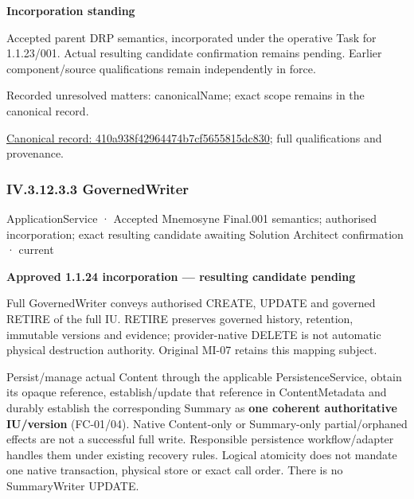 \par\medskip\textbf{Incorporation standing}\par


Accepted parent DRP semantics, incorporated under the operative Task for 1.1.23/001. Actual resulting candidate confirmation remains pending. Earlier component/source qualifications remain independently in force.


{\small Recorded unresolved matters: canonicalName; exact scope remains in the canonical record.}\par
{\footnotesize \href{../../../../../../../continuum/application/application-service/410a938f42964474b7cf5655815dc830.md}{Canonical record: 410a938f42964474b7cf5655815dc830}; full qualifications and provenance.}\par
\subsubsection*{IV.3.12.3.3 GovernedWriter}
\label{navigation:IV.3.12.3.3}

\label{element:105f6ebe61f74bc6b51938ba550bc1a7}
{\small ApplicationService · Accepted Mnemosyne Final.001 semantics; authorised incorporation; exact resulting candidate awaiting Solution Architect confirmation · current}\par

\par\medskip\textbf{Approved 1.1.24 incorporation — resulting candidate pending}\par


Full GovernedWriter conveys authorised CREATE, UPDATE and governed RETIRE of the full IU. RETIRE preserves governed history, retention, immutable versions and evidence; provider-native DELETE is not automatic physical destruction authority. Original MI-07 retains this mapping subject.



Persist/manage actual Content through the applicable PersistenceService, obtain its opaque reference, establish/update that reference in ContentMetadata and durably establish the corresponding Summary as \textbf{one coherent authoritative IU/version} (FC-01/04). Native Content-only or Summary-only partial/orphaned effects are not a successful full write. Responsible persistence workflow/adapter handles them under existing recovery rules. Logical atomicity does not mandate one native transaction, physical store or exact call order. There is no SummaryWriter UPDATE.



